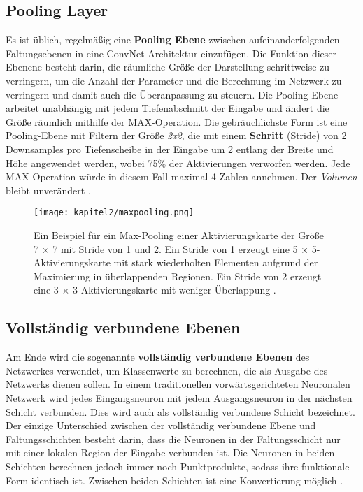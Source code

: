 \subsection{Pooling Layer}
Es ist üblich, regelmäßig eine \textbf{Pooling Ebene} zwischen aufeinanderfolgenden Faltungsebenen in eine ConvNet-Architektur einzufügen. Die Funktion dieser Ebenene besteht darin, die räumliche Größe der Darstellung schrittweise zu verringern, um die Anzahl der Parameter und die Berechnung im Netzwerk zu verringern und damit auch die Überanpassung zu steuern. Die Pooling-Ebene arbeitet unabhängig mit jedem Tiefenabschnitt der Eingabe und ändert die Größe räumlich mithilfe der MAX-Operation. Die gebräuchlichste Form ist eine Pooling-Ebene mit Filtern der Größe \textit{2x2}, die mit einem\textbf{ Schritt} (Stride) von 2 Downsamples pro Tiefenscheibe in der Eingabe um 2 entlang der Breite und Höhe angewendet werden, wobei 75\% der Aktivierungen verworfen werden. Jede MAX-Operation würde in diesem Fall maximal 4 Zahlen annehmen. Der \textit{Volumen} bleibt unverändert \cite*{StanfordUniversityCoursecs231n2018a}.

\begin{figure}[H]
    \centering
    \texttt{[image: kapitel2/maxpooling.png]}
    \caption[Max-Pooling]{Ein Beispiel für ein Max-Pooling einer Aktivierungskarte der Größe 7 × 7 mit Stride von 1 und 2. Ein Stride von 1 erzeugt eine 5 × 5-Aktivierungskarte mit stark wiederholten Elementen aufgrund der Maximierung in überlappenden Regionen. Ein Stride von 2 erzeugt eine 3 × 3-Aktivierungskarte mit weniger Überlappung \cite*[326]{Aggarwal2018}.}
    \label{Kap2:Pooling}
\end{figure}


\subsection{Vollständig verbundene Ebenen}
Am Ende wird die sogenannte \textbf{vollständig verbundene Ebenen} des Netzwerkes verwendet, um Klassenwerte zu berechnen, die als Ausgabe des Netzwerks dienen sollen. In einem traditionellen vorwärtsgerichteten Neuronalen Netzwerk wird jedes Eingangsneuron mit jedem Ausgangsneuron in der nächsten Schicht verbunden. Dies wird auch als vollständig verbundene Schicht bezeichnet. Der einzige Unterschied zwischen der vollständig verbundene Ebene und Faltungsschichten besteht darin, dass die Neuronen in der Faltungsschicht nur mit einer lokalen Region der Eingabe verbunden ist. Die Neuronen in beiden Schichten berechnen jedoch immer noch Punktprodukte, sodass ihre funktionale Form identisch ist. Zwischen beiden Schichten ist eine Konvertierung möglich \cite*{StanfordUniversityCoursecs231n2018a}.



